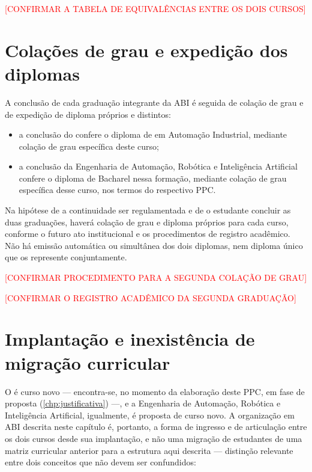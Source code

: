 \textcolor{red}{[CONFIRMAR A TABELA DE EQUIVALÊNCIAS ENTRE OS DOIS CURSOS]}

\section{Colações de grau e expedição dos diplomas}
\label{sec:diplomas}

A conclusão de cada graduação integrante da ABI é seguida de colação de grau e de expedição de diploma próprios e distintos:

\begin{itemize}
    \item a conclusão do \ppccurso confere o diploma de \ppcgrau em Automação Industrial, mediante colação de grau específica deste curso;
    \item a conclusão da Engenharia de Automação, Robótica e Inteligência Artificial confere o diploma de Bacharel nessa formação, mediante colação de grau específica desse curso, nos termos do respectivo PPC.
\end{itemize}

Na hipótese de a continuidade ser regulamentada e de o estudante concluir as duas graduações, haverá colação de grau e diploma próprios para cada curso, conforme o futuro ato institucional e os procedimentos de registro acadêmico. Não há emissão automática ou simultânea dos dois diplomas, nem diploma único que os represente conjuntamente.

\textcolor{red}{[CONFIRMAR PROCEDIMENTO PARA A SEGUNDA COLAÇÃO DE GRAU]}

\textcolor{red}{[CONFIRMAR O REGISTRO ACADÊMICO DA SEGUNDA GRADUAÇÃO]}

\section{Implantação e inexistência de migração curricular}
\label{sec:migracao_curricular}

O \ppccurso é curso novo — encontra-se, no momento da elaboração deste PPC, em fase de proposta (\autoref{chp:justificativa}) —, e a Engenharia de Automação, Robótica e Inteligência Artificial, igualmente, é proposta de curso novo. A organização em ABI descrita neste capítulo é, portanto, a forma de ingresso e de articulação entre os dois cursos desde sua implantação, e não uma migração de estudantes de uma matriz curricular anterior para a estrutura aqui descrita — distinção relevante entre dois conceitos que não devem ser confundidos:

